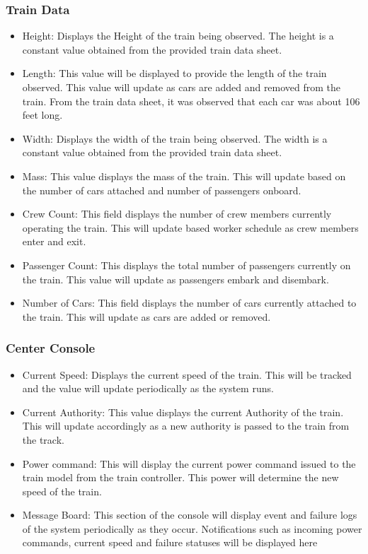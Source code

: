 \documentclass[letterpaper]{article}
\begin{document}
\subsubsection{Train Data}
\begin{itemize}
	\item Height:  Displays the Height of the train being observed. The height is a constant value obtained from the provided train data sheet.
	\item Length: This value will be displayed to provide the length of the train observed. This value will update as cars are added and removed from the train. From the train data sheet, it was observed that each car was about 106 feet long.
	\item Width:  Displays the width of the train being observed. The width is a constant value obtained from the provided train data sheet.
	\item Mass: This value displays the mass of the train. This will update based on the number of cars attached and number of passengers onboard.
	\item Crew Count: This field displays the number of crew members currently operating the train. This will update based worker schedule as crew members enter and exit.
	\item Passenger Count: This displays the total number of passengers currently on the train. This value will update as passengers embark and disembark.
	\item Number of Cars: This field displays the number of cars currently attached to the train. This will update as cars are added or removed.
\end{itemize}

\subsubsection{Center Console}
\begin{itemize}
	\item Current Speed:  Displays the current speed of the train. This will be tracked and the value will update periodically as the system runs.
	\item Current Authority:  This value displays the current Authority of the train. This will update accordingly as a new authority is passed to the train from the track.
	\item Power command: This will display the current power command issued to the train model from the train controller. This power will determine the new speed of the train.
	\item Message Board: This section of the console will display event and failure logs of the system periodically as they occur. Notifications such as incoming power commands, current speed and failure statuses will be displayed here
\end{itemize}
\end{document}
